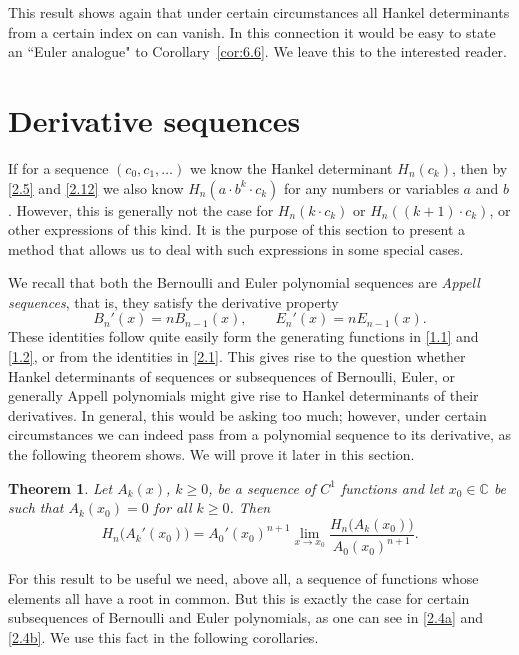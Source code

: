 \documentclass{amsart}
\theoremstyle{plain}
\newtheorem{theorem}{Theorem}[section]
\numberwithin{equation}{section}
\begin{document}
This result shows again that under certain circumstances all Hankel determinants
from a certain index on can vanish. In this connection it would be easy to 
state an ``Euler analogue" to Corollary~\ref{cor:6.6}. We leave this to the
interested reader. 

\section{Derivative sequences}

If for a sequence $(c_0, c_1,\ldots)$ we know the Hankel determinant $H_n(c_k)$,
then by \eqref{2.5} and \eqref{2.12} we also know $H_n(a\cdot b^k\cdot c_k)$ for
any numbers or variables $a$ and $b$. However, this is generally not the case
for $H_n(k\cdot c_k)$ or $H_n((k+1)\cdot c_k)$, or other expressions of this
kind. It is the purpose of this section to present a method that allows us to
deal with such expressions in some special cases.

We recall that both the Bernoulli and Euler polynomial sequences are {\it Appell
sequences\/}, that is, they satisfy the derivative property
\begin{equation}\label{5.1}
B_n'(x) = nB_{n-1}(x),\qquad E_n'(x) = nE_{n-1}(x).
\end{equation}
These identities follow quite easily form the generating functions in 
\eqref{1.1} and \eqref{1.2}, or from the identities in \eqref{2.1}. This 
gives rise to the question whether Hankel determinants of sequences or 
subsequences of Bernoulli, Euler, or generally Appell polynomials might give
rise to Hankel determinants of their derivatives. In general, this would be
asking too much; however, under certain circumstances we can indeed pass from
a polynomial sequence to its derivative, as the following theorem shows. We 
will prove it later in this section.

\begin{theorem}\label{thm:5.1}
Let $A_k(x)$, $k\geq 0$, be a sequence of $C^1$ functions and let
$x_0\in{\mathbb C}$ be such that $A_k(x_0)=0$ for all $k\geq 0$. Then
\begin{equation}\label{5.2}
H_n\big(A_k'(x_0)\big) = A_0'(x_0)^{n+1}
\lim_{x\to x_0}\frac{H_n\big(A_k(x_0)\big)}{A_0(x_0)^{n+1}}.
\end{equation}
\end{theorem}

For this result to be useful we need, above all, a sequence of functions whose
elements all have a root in common. But this is exactly the case for certain 
subsequences of Bernoulli and Euler polynomials, as one can see in \eqref{2.4a}
and \eqref{2.4b}. We use this fact in the following corollaries.
\end{document}
